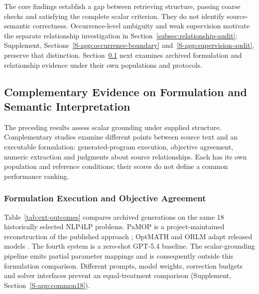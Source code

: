 \documentclass[pdflatex,sn-basic,Numbered]{sn-jnl}
\begin{document}
\label{subsec:numerical-grounding-challenges}
The core findings establish a gap between retrieving structure, passing coarse checks and satisfying the complete scalar criterion. They do not identify source-semantic correctness. Occurrence-level ambiguity and weak supervision motivate the separate relationship investigation in Section~\ref{subsec:relationship-audit}; Supplement, Sections~\ref{S-app:occurrence-boundary} and~\ref{S-app:supervision-audit}, preserve that distinction. Section~\ref{sec:llm} next examines archived formulation and relationship evidence under their own populations and protocols.

\subsection{Complementary Evidence on Formulation and Semantic Interpretation}
\label{sec:llm}
The preceding results assess scalar grounding under supplied structure. Complementary studies examine different points between source text and an executable formulation: generated-program execution, objective agreement, numeric extraction and judgments about source relationships. Each has its own population and reference conditions; their scores do not define a common performance ranking.

\subsubsection{Formulation Execution and Objective Agreement}
\label{subsec:exp_external}
Table~\ref{tab:ext-outcomes} compares archived generations on the same 18 historically selected NLP4LP problems. PaMOP is a project-maintained reconstruction of the published approach \cite{pan2025pamop}; OptMATH and ORLM adapt released models \cite{lu2025optmath,huang2025orlm}. The fourth system is a zero-shot GPT-5.4 baseline. The scalar-grounding pipeline emits partial parameter mappings and is consequently outside this formulation comparison. Different prompts, model weights, correction budgets and solver interfaces prevent an equal-treatment comparison (Supplement, Section~\ref{S-app:common18}).
\end{document}
